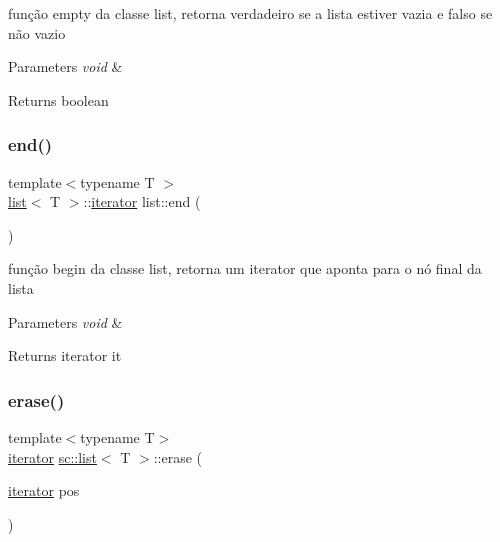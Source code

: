 função empty da classe list, retorna verdadeiro se a lista estiver vazia e falso se não vazio 
\begin{DoxyParams}{Parameters}
{\em void} & \\
\hline
\end{DoxyParams}
\begin{DoxyReturn}{Returns}
boolean 
\end{DoxyReturn}
\mbox{\label{classsc_1_1list_a31c42556b18886277d436ec540019349}} 
\subsubsection{\texorpdfstring{end()}{end()}}
{\footnotesize\ttfamily template$<$typename T $>$ \\
\mbox{\hyperlink{classsc_1_1list}{list}}$<$ T $>$\+::\mbox{\hyperlink{classsc_1_1list_1_1iterator}{iterator}} list\+::end (\begin{DoxyParamCaption}{ }\end{DoxyParamCaption})}

função begin da classe list, retorna um iterator que aponta para o nó final da lista 
\begin{DoxyParams}{Parameters}
{\em void} & \\
\hline
\end{DoxyParams}
\begin{DoxyReturn}{Returns}
iterator it 
\end{DoxyReturn}
\mbox{\label{classsc_1_1list_a12a195a7ebaf3455f245caa852b44a9b}} 
\subsubsection{\texorpdfstring{erase()}{erase()}\hspace{0.1cm}{\footnotesize\ttfamily [1/2]}}
{\footnotesize\ttfamily template$<$typename T$>$ \\
\mbox{\hyperlink{classsc_1_1list_1_1iterator}{iterator}} \mbox{\hyperlink{classsc_1_1list}{sc\+::list}}$<$ T $>$\+::erase (\begin{DoxyParamCaption}\item[{\mbox{\hyperlink{classsc_1_1list_1_1iterator}{iterator}}}]{pos }\end{DoxyParamCaption})}

